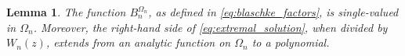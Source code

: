 \documentclass[12pt,oneside,reqno]{amsart}
\newtheorem{lemma}[theorem]{Lemma}
\theoremstyle{definition}
\numberwithin{equation}{section}
\newcommand{\sfA}{\mathsf{A}}
\newcommand{\cP}{{\mathcal{P}}}
\begin{document}

\begin{lemma} \label{Bn}
The function $B_n^{\Omega_n}$, as defined in \eqref{eq:blaschke_factors}, is single-valued in $\Omega_n$. Moreover, the right-hand side of \eqref{eq:extremal_solution}, when divided by $W_n(z)$, extends from an analytic function on $\Omega_n$ to a polynomial.
\end{lemma}
\end{document}

